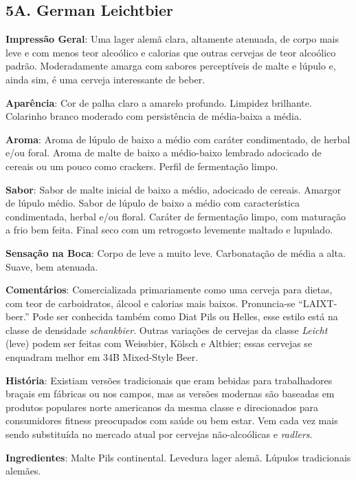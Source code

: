 \subsection*{5A. German Leichtbier}

\textbf{Impressão Geral}: Uma lager alemã clara, altamente atenuada, de corpo mais leve e com menos teor alcoólico e calorias que outras cervejas de teor alcoólico padrão. Moderadamente amarga com sabores perceptíveis de malte e lúpulo e, ainda sim, é uma cerveja interessante de beber.

\textbf{Aparência}: Cor de palha claro a amarelo profundo. Limpidez brilhante. Colarinho branco moderado com persistência de média-baixa a média.

\textbf{Aroma}: Aroma de lúpulo de baixo a médio com caráter condimentado, de herbal e/ou foral. Aroma de malte de baixo a médio-baixo lembrado adocicado de cereais ou um pouco como crackers. Perfil de fermentação limpo.

\textbf{Sabor}: Sabor de malte inicial de baixo a médio, adocicado de cereais. Amargor de lúpulo médio. Sabor de lúpulo de baixo a médio com característica condimentada, herbal e/ou floral. Caráter de fermentação limpo, com maturação a frio bem feita. Final seco com um retrogosto levemente maltado e lupulado.

\textbf{Sensação na Boca}: Corpo de leve a muito leve. Carbonatação de média a alta. Suave, bem atenuada.

\textbf{Comentários}: Comercializada primariamente como uma cerveja para dietas, com teor de carboidratos, álcool e calorias mais baixos. Pronuncia-se “LAIXT-beer.” Pode ser conhecida também como Diat Pils ou Helles, esse estilo está na classe de densidade \textit{schankbier}. Outras variações de cervejas da classe \textit{Leicht} (leve) podem ser feitas com Weissbier, Kölsch e Altbier; essas cervejas se enquadram melhor em 34B Mixed-Style Beer.

\textbf{História}: Existiam versões tradicionais que eram bebidas para trabalhadores braçais em fábricas ou nos campos, mas as versões modernas são baseadas em produtos populares norte americanos da mesma classe e direcionados para consumidores fitness preocupados com saúde ou bem estar. Vem cada vez mais sendo substituída no mercado atual por cervejas não-alcoólicas e \textit{radlers}.

\textbf{Ingredientes}: Malte Pils continental. Levedura lager alemã. Lúpulos tradicionais alemães.

